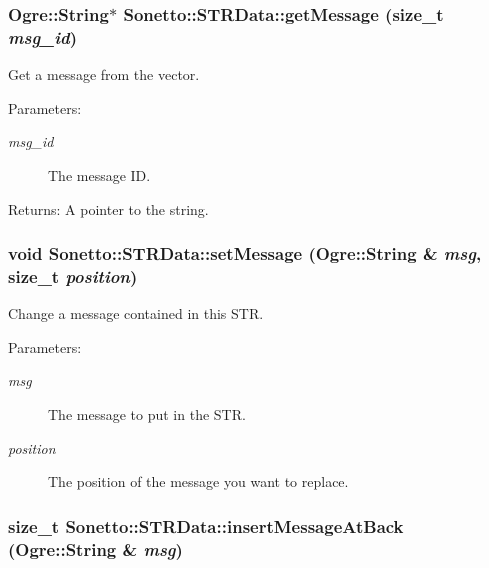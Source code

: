 \subsubsection{\setlength{\rightskip}{0pt plus 5cm}Ogre::String$\ast$ Sonetto::STRData::getMessage (size\_\-t {\em msg\_\-id})}\label{class_sonetto_1_1_s_t_r_data_8fab08faa4ba54c1d686d2de411f34ca}


Get a message from the vector. \begin{Desc}
\item[Parameters:]
\begin{description}
\item[{\em msg\_\-id}]The message ID. \end{description}
\end{Desc}
\begin{Desc}
\item[Returns:]A pointer to the string. \end{Desc}
\subsubsection{\setlength{\rightskip}{0pt plus 5cm}void Sonetto::STRData::setMessage (Ogre::String \& {\em msg}, size\_\-t {\em position})}\label{class_sonetto_1_1_s_t_r_data_aa5f0973cf45c9f188efe13e925c4a72}


Change a message contained in this STR. \begin{Desc}
\item[Parameters:]
\begin{description}
\item[{\em msg}]The message to put in the STR. \item[{\em position}]The position of the message you want to replace. \end{description}
\end{Desc}
\subsubsection{\setlength{\rightskip}{0pt plus 5cm}size\_\-t Sonetto::STRData::insertMessageAtBack (Ogre::String \& {\em msg})}\label{class_sonetto_1_1_s_t_r_data_beb85ab8afd9513924ae124556ac08a2}


